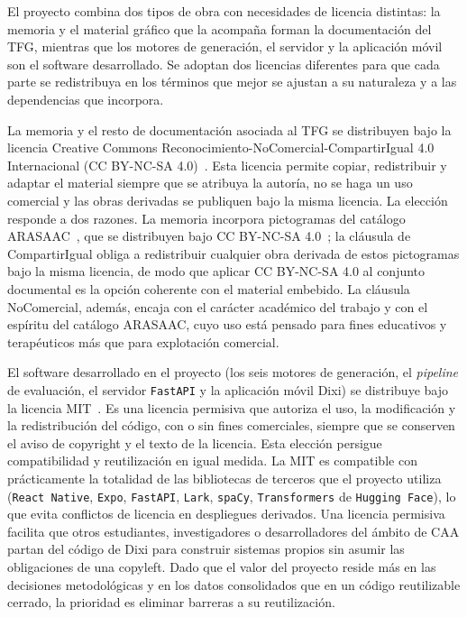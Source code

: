 
El proyecto combina dos tipos de obra con necesidades de licencia distintas: la memoria y el material gráfico que la acompaña forman la documentación del TFG, mientras que los motores de generación, el servidor y la aplicación móvil son el software desarrollado. Se adoptan dos licencias diferentes para que cada parte se redistribuya en los términos que mejor se ajustan a su naturaleza y a las dependencias que incorpora.

La memoria y el resto de documentación asociada al TFG se distribuyen bajo la licencia Creative Commons Reconocimiento-NoComercial-CompartirIgual 4.0 Internacional (CC BY-NC-SA 4.0)~\cite{ccbyncsa4}. Esta licencia permite copiar, redistribuir y adaptar el material siempre que se atribuya la autoría, no se haga un uso comercial y las obras derivadas se publiquen bajo la misma licencia. La elección responde a dos razones. La memoria incorpora pictogramas del catálogo ARASAAC~\cite{arasaac}, que se distribuyen bajo CC BY-NC-SA 4.0~\cite{ccbyncsa4}; la cláusula de CompartirIgual obliga a redistribuir cualquier obra derivada de estos pictogramas bajo la misma licencia, de modo que aplicar CC BY-NC-SA 4.0 al conjunto documental es la opción coherente con el material embebido. La cláusula NoComercial, además, encaja con el carácter académico del trabajo y con el espíritu del catálogo ARASAAC, cuyo uso está pensado para fines educativos y terapéuticos más que para explotación comercial.

El software desarrollado en el proyecto (los seis motores de generación, el \textit{pipeline} de evaluación, el servidor \texttt{FastAPI} y la aplicación móvil Dixi) se distribuye bajo la licencia MIT~\cite{mitlicense}. Es una licencia permisiva que autoriza el uso, la modificación y la redistribución del código, con o sin fines comerciales, siempre que se conserven el aviso de copyright y el texto de la licencia. Esta elección persigue compatibilidad y reutilización en igual medida. La MIT es compatible con prácticamente la totalidad de las bibliotecas de terceros que el proyecto utiliza (\texttt{React Native}, \texttt{Expo}, \texttt{FastAPI}, \texttt{Lark}, \texttt{spaCy}, \texttt{Transformers} de \texttt{Hugging Face}), lo que evita conflictos de licencia en despliegues derivados. Una licencia permisiva facilita que otros estudiantes, investigadores o desarrolladores del ámbito de CAA partan del código de Dixi para construir sistemas propios sin asumir las obligaciones de una copyleft. Dado que el valor del proyecto reside más en las decisiones metodológicas y en los datos consolidados que en un código reutilizable cerrado, la prioridad es eliminar barreras a su reutilización.


